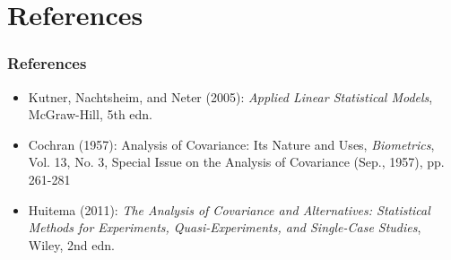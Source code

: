 \documentclass[10pt]{beamer}
\theoremstyle{definition}
\begin{document}
\section{References}
\begin{frame}[fragile]
\frametitle{References}
\begin{itemize}
	\item Kutner, Nachtsheim, and Neter (2005): \emph{Applied Linear Statistical Models}, McGraw-Hill, 5th edn.
	\item Cochran (1957): Analysis of Covariance: Its Nature and Uses, \emph{Biometrics}, Vol. 13, No. 3, Special Issue on the Analysis of Covariance (Sep., 1957), pp. 261-281
	\item Huitema (2011): \emph{The Analysis of Covariance and Alternatives: Statistical Methods for Experiments, Quasi-Experiments, and Single-Case Studies}, Wiley, 2nd edn.
\end{itemize}
\end{frame}
\end{document}
